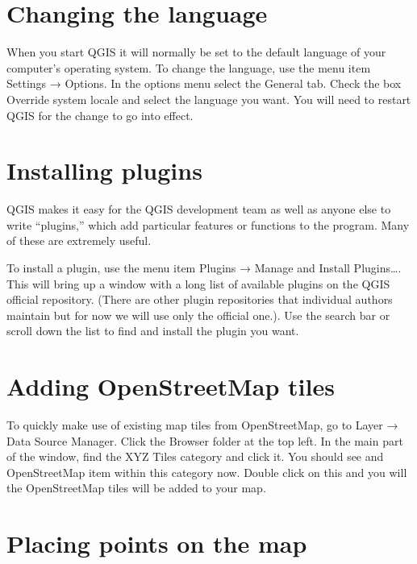\documentclass[]{book}
\begin{document}
\hypertarget{changing-the-language}{%
\section{Changing the language}\label{changing-the-language}}

When you start QGIS it will normally be set to the default language of your computer's operating system. To change the language, use the menu item Settings → Options. In the options menu select the General tab. Check the box Override system locale and select the language you want. You will need to restart QGIS for the change to go into effect.

\hypertarget{installing-plugins}{%
\section{Installing plugins}\label{installing-plugins}}

QGIS makes it easy for the QGIS development team as well as anyone else to write ``plugins,'' which add particular features or functions to the program. Many of these are extremely useful.

To install a plugin, use the menu item Plugins → Manage and Install Plugins\ldots{}. This will bring up a window with a long list of available plugins on the QGIS official repository. (There are other plugin repositories that individual authors maintain but for now we will use only the official one.). Use the search bar or scroll down the list to find and install the plugin you want.

\hypertarget{adding-openstreetmap-tiles}{%
\section{Adding OpenStreetMap tiles}\label{adding-openstreetmap-tiles}}

To quickly make use of existing map tiles from OpenStreetMap, go to Layer → Data Source Manager. Click the Browser folder at the top left. In the main part of the window, find the XYZ Tiles category and click it. You should see and OpenStreetMap item within this category now. Double click on this and you will the OpenStreetMap tiles will be added to your map.

\hypertarget{placing-points-on-the-map}{%
\section{Placing points on the map}\label{placing-points-on-the-map}}
\end{document}
